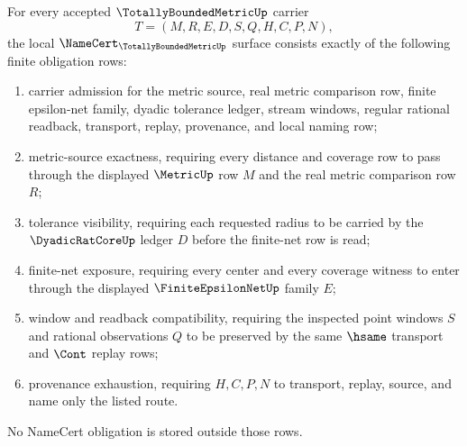 \begin{theorem}
\label{thm:totally-bounded-metric-namecert-obligations}
For every accepted $\TotallyBoundedMetricUp$ carrier
$$
T=(M,R,E,D,S,Q,H,C,P,N),
$$
the local $\NameCert_{\TotallyBoundedMetricUp}$ surface consists exactly of the following finite obligation rows:
\begin{enumerate}
\item carrier admission for the metric source, real metric comparison row, finite epsilon-net family, dyadic tolerance ledger, stream windows, regular rational readback, transport, replay, provenance, and local naming row;
\item metric-source exactness, requiring every distance and coverage row to pass through the displayed $\MetricUp$ row $M$ and the real metric comparison row $R$;
\item tolerance visibility, requiring each requested radius to be carried by the $\DyadicRatCoreUp$ ledger $D$ before the finite-net row is read;
\item finite-net exposure, requiring every center and every coverage witness to enter through the displayed $\FiniteEpsilonNetUp$ family $E$;
\item window and readback compatibility, requiring the inspected point windows $S$ and rational observations $Q$ to be preserved by the same $\hsame$ transport and $\Cont$ replay rows;
\item provenance exhaustion, requiring $H,C,P,N$ to transport, replay, source, and name only the listed route.
\end{enumerate}
No NameCert obligation is stored outside those rows.
\end{theorem}
